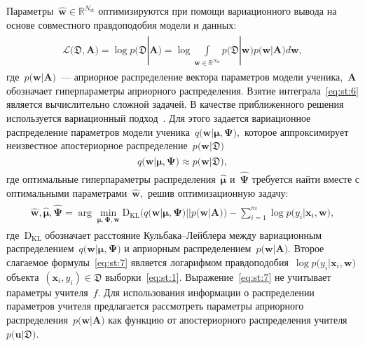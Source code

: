 \documentclass[12pt]{a&t}
\begin{document}
Параметры~$\hat{\mathbf{w}} \in \mathbb{R}^{N_{\text{st}}}$ оптимизируются при помощи вариационного вывода на основе совместного правдоподобия модели и данных:
\begin{gather}
\label{eq:st:6}
\begin{aligned}
\mathcal{L}\bigr(\mathfrak{D}, \mathbf{A}\bigr) = \log p\bigr(\mathfrak{D}|\mathbf{A}\bigr) = \log \int\limits_{\mathbf{w} \in \mathbb{R}^{N_{\text{st}}}}p\bigr(\mathfrak{D}|\mathbf{w}\bigr)p\bigr(\mathbf{w}|\mathbf{A}\bigr)d\mathbf{w},
\end{aligned}
\end{gather}
где~$p\bigr(\mathbf{w}| \mathbf{A}\bigr)$~--- априорное распределение вектора параметров модели ученика,~$\mathbf{A}$ обозначает гиперпараметры априорного распределения.
Взятие интеграла~\eqref{eq:st:6} является вычислительно сложной задачей. В качестве приближенного решения используется вариационный подход~\cite{graves2011, grabovoy2019}. Для этого задается вариационное распределение параметров модели ученика~$q\bigr(\mathbf{w}|\bm{\mu}, \bm{\Psi}\bigr),$ которое аппроксимирует неизвестное апостериорное распределение~$p\bigr(\mathbf{w}|\mathfrak{D}\bigr)$
\begin{gather}
\label{eq:st:new:1}
\begin{aligned}
q\bigr(\mathbf{w}|\bm{\mu}, \bm{\Psi}\bigr) \approx  p\bigr(\mathbf{w}|\mathfrak{D}\bigr),
\end{aligned}
\end{gather}
где оптимальные гиперпараметры распределения~$\hat{\bm{\mu}}$ и~$\hat{\bm{\Psi}}$ требуется найти вместе с оптимальными параметрами~$\hat{\mathbf{w}},$ решив оптимизационную задачу:
\begin{gather}
\label{eq:st:7}
\begin{aligned}
\hat{\mathbf{w}}, \hat{\bm{\mu}}, \hat{\bm{\Psi}} = \arg \min_{\bm{\mu}, \bm{\Psi}, \mathbf{w}} \text{D}_{\text{KL}}\bigr(q\bigr(\mathbf{w}|\bm{\mu}, \bm{\Psi}\bigr)||p\bigr(\mathbf{w}|\mathbf{A}\bigr)\bigr) - \sum_{i=1}^{m}\log p\bigr(y_i|\mathbf{x}_{i}, \mathbf{w}\bigr),
\end{aligned}
\end{gather}
где~$\text{D}_{\text{KL}}$ обозначает расстояние Кульбака--Лейблера между вариационным распределением~$q\bigr(\mathbf{w}|\bm{\mu}, \bm{\Psi}\bigr)$ и априорным распределением~$p\bigr(\mathbf{w}|\mathbf{A}\bigr).$ Второе слагаемое формулы~\eqref{eq:st:7} является логарифмом правдоподобия~$\log p\bigr(y_i|\mathbf{x}_{i}, \mathbf{w}\bigr)$ объекта~$\left(\mathbf{x}_i, y_i\right) \in \mathfrak{D}$ выборки~\eqref{eq:st:1}.
Выражение~\eqref{eq:st:7} не учитывает параметры учителя~$f$. Для использования информации о распределении параметров учителя предлагается рассмотреть параметры априорного распределения~$p\bigr(\mathbf{w}|\mathbf{A}\bigr)$ как функцию от апостериорного распределения учителя~$p\bigr(\mathbf{u}|\mathfrak{D}\bigr)$.
\end{document}
